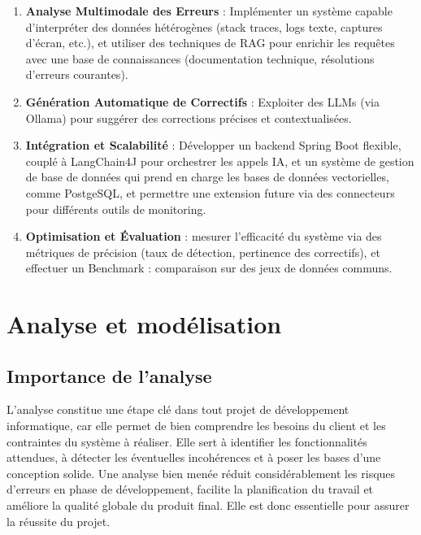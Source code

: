 \documentclass[12pt,a4paper]{report}
\begin{document}
	\begin{enumerate}
		\item \textbf{Analyse Multimodale des Erreurs} : Implémenter un système capable d’interpréter des données hétérogènes (stack traces, logs texte, captures d’écran, etc.), et utiliser des techniques de RAG pour enrichir les requêtes avec une base de connaissances (documentation technique, résolutions d’erreurs courantes).
		
		\item \textbf{Génération Automatique de Correctifs} : Exploiter des LLMs (via Ollama) pour suggérer des corrections précises et contextualisées.
		
		\item \textbf{Intégration et Scalabilité} : Développer un backend Spring Boot flexible, couplé à LangChain4J pour orchestrer les appels IA, et un système de gestion de base de données qui prend en charge les bases de données vectorielles, comme PostgeSQL, et permettre une extension future via des connecteurs pour différents outils de monitoring.
		
		\item \textbf{Optimisation et Évaluation} : mesurer l’efficacité du système via des métriques de précision (taux de détection, pertinence des correctifs), et effectuer un Benchmark : comparaison sur des jeux de données communs.
		
	\end{enumerate}
	

	
	\chapter{Analyse et modélisation}
	
	\section{Importance de l'analyse}
	
	L’analyse constitue une étape clé dans tout projet de développement informatique, car elle permet de bien comprendre les besoins du client et les contraintes du système à réaliser. Elle sert à identifier les fonctionnalités attendues, à détecter les éventuelles incohérences et à poser les bases d’une conception solide. Une analyse bien menée réduit considérablement les risques d’erreurs en phase de développement, facilite la planification du travail et améliore la qualité globale du produit final. Elle est donc essentielle pour assurer la réussite du projet.
	
\end{document}
